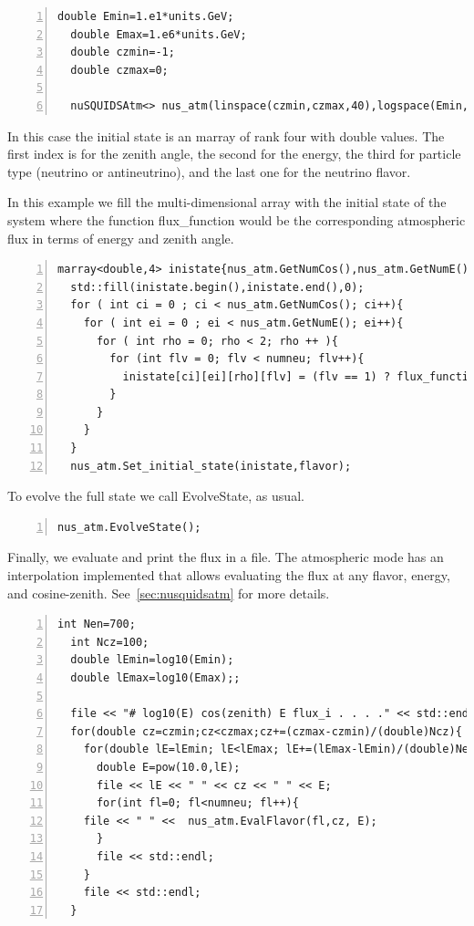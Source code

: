 \documentclass[3p,12pt]{elsarticle}
\newcommand{\ttf}{\ttfamily}
\begin{document}
\begin{lstlisting}[frame=leftline, numbers =
  left,breaklines=true,label = ex:sin1]
  double Emin=1.e1*units.GeV;
  double Emax=1.e6*units.GeV;
  double czmin=-1;
  double czmax=0;

  nuSQUIDSAtm<> nus_atm(linspace(czmin,czmax,40),logspace(Emin,Emax,100),numneu,both,interactions);
\end{lstlisting}

In this case the initial state is an {\ttf marray} of rank four with double values.  
The first index is for the zenith angle, the second for the energy, the
third for particle type (neutrino or antineutrino), and the last one
for the neutrino flavor.

In this example we fill the multi-dimensional array with the initial state of the
system where the function {\ttf flux\_function} would be the corresponding
atmospheric flux in terms of energy and zenith angle.

\begin{lstlisting}[frame=leftline, numbers =
  left,breaklines=true,label = ex:sin1,firstnumber=last]
  marray<double,4> inistate{nus_atm.GetNumCos(),nus_atm.GetNumE(),2,numneu};
  std::fill(inistate.begin(),inistate.end(),0);
  for ( int ci = 0 ; ci < nus_atm.GetNumCos(); ci++){
    for ( int ei = 0 ; ei < nus_atm.GetNumE(); ei++){
      for ( int rho = 0; rho < 2; rho ++ ){
        for (int flv = 0; flv < numneu; flv++){
          inistate[ci][ei][rho][flv] = (flv == 1) ? flux_function(e_range[ei], cz_range[ci]) : 0.0;//set 1 only to the muon flavor
        }
      }
    }
  }
  nus_atm.Set_initial_state(inistate,flavor);
\end{lstlisting}

To evolve the full state we call {\ttf EvolveState}, as usual. 

\begin{lstlisting}[frame=leftline, numbers =
  left,breaklines=true,label = ex:sin1,firstnumber=last]
nus_atm.EvolveState();
\end{lstlisting}

Finally, we evaluate and print the flux in a file. The
atmospheric mode has an interpolation implemented that allows
evaluating the flux at any flavor, energy, and cosine-zenith. See~\ref{sec:nusquidsatm}
for more details.

\begin{lstlisting}[frame=leftline, numbers =
  left,breaklines=true,label = ex:sin1,firstnumber=last]
  int Nen=700;
  int Ncz=100;
  double lEmin=log10(Emin);
  double lEmax=log10(Emax);;

  file << "# log10(E) cos(zenith) E flux_i . . . ." << std::endl;
  for(double cz=czmin;cz<czmax;cz+=(czmax-czmin)/(double)Ncz){
    for(double lE=lEmin; lE<lEmax; lE+=(lEmax-lEmin)/(double)Nen){
      double E=pow(10.0,lE);
      file << lE << " " << cz << " " << E;
      for(int fl=0; fl<numneu; fl++){
	file << " " <<  nus_atm.EvalFlavor(fl,cz, E);
      }
      file << std::endl;
    }
    file << std::endl;
  }
\end{lstlisting}
\end{document}
